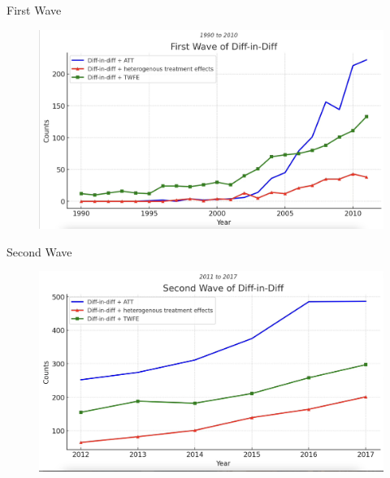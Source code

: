\documentclass{beamer}
\begin{document}
\begin{frame}{First Wave}

	\begin{figure}
	\includegraphics[scale=0.15]{./lecture_includes/wave1}
	\end{figure}

\end{frame}


\begin{frame}{Second Wave}

	\begin{figure}
	\includegraphics[scale=0.15]{./lecture_includes/wave2}
	\end{figure}

\end{frame}
\end{document}
